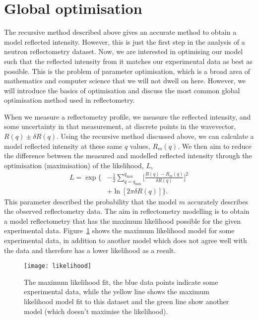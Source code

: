 \documentclass[
 reprint,
 superscriptaddress,
 amsmath,amssymb,
 aps,
]{revtex4-1}
\begin{document}
\section{Global optimisation}

The recursive method described above gives an accurate method to obtain a model reflected intensity.
However, this is just the first step in the analysis of a neutron reflectometry dataset.
Now, we are interested in optimising our model such that the reflected intensity from it matches our experimental data as best as possible.
This is the problem of parameter optimisation, which is a broad area of mathematics and computer science that we will not dwell on here. 
However, we will introduce the basics of optimisation and discuss the most common global optimisation method used in reflectometry.

When we measure a reflectometry profile, we measure the reflected intensity, and some uncertainty in that measurement, at discrete points in the wavevector, $R(q) \pm \delta R(q)$.
Using the recursive method discussed above, we can calculate a model reflected intensity at these same $q$ values, $R_m(q)$.
We then aim to reduce the difference between the measured and modelled reflected intensity through the optimisation (maximisation) of the likelihood, $L$, %
%
\begin{equation}
    \begin{aligned}
        L = \exp\bigg\{ & - \frac{1}{2} \sum_{q=q_{\text{min}}}^{q_{\text{max}}} \bigg[\frac{R(q) - R_m(q)}{\delta R(q)}\bigg]^2 \\
         & + \ln[2\pi \delta R(q)]\bigg\}.
    \end{aligned}
\end{equation}
%
This parameter described the probability that the model $m$ accurately describes the observed reflectometry data.
The aim in reflectometry modelling is to obtain a model reflectometry that has the maximum likelihood possible for the given experimental data.
Figure~\ref{fig:likelihood} shows the maximum likelihood model for some experimental data, in addition to another model which does not agree well with the data and therefore has a lower likelihood as a result.
%
\begin{figure}[t]
    \texttt{[image: likelihood]}
    \caption{The maximum likelihood fit, the blue data points indicate some experimental data, while the yellow line shows the maximum likelihood model fit to this dataset and the green line show another model (which doesn't maximise the likelihood).}
    \label{fig:likelihood}
\end{figure}
%
\end{document}
